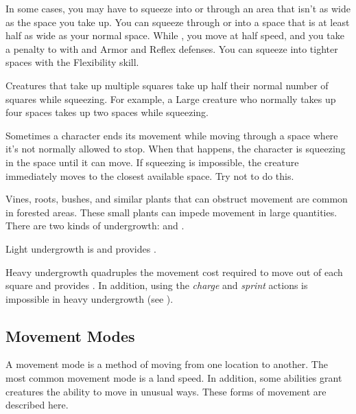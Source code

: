         \label{Squeezing}
        In some cases, you may have to squeeze into or through an area that isn't as wide as the space you take up.
        You can squeeze through or into a space that is at least half as wide as your normal space.
        While , you move at half speed, and you take a  penalty to  with  and Armor and Reflex defenses.
        You can squeeze into tighter spaces with the Flexibility skill.

        Creatures that take up multiple squares take up half their normal number of squares while squeezing. For example, a Large creature who normally takes up four spaces takes up two spaces while squeezing.

         Sometimes a character ends its movement while moving through a space where it's not normally allowed to stop. When that happens, the character is squeezing in the space until it can move. If squeezing is impossible, the creature immediately moves to the closest available space. Try not to do this.

        \label{Undergrowth} Vines, roots, bushes, and similar plants that can obstruct movement are common in forested areas.
        These small plants can impede movement in large quantities.
        There are two kinds of undergrowth:  and .

        \label{Light Undergrowth}
        Light undergrowth is  and provides .

        \label{Heavy Undergrowth}
        Heavy undergrowth quadruples the movement cost required to move out of each square and provides .
        In addition, using the \textit{charge} and \textit{sprint} actions is impossible in heavy undergrowth (see ).

    \subsection{Movement Modes}\label{Movement Modes}
        A movement mode is a method of moving from one location to another.
        The most common movement mode is a land speed.
        In addition, some abilities grant creatures the ability to move in unusual ways.
        These forms of movement are described here.

